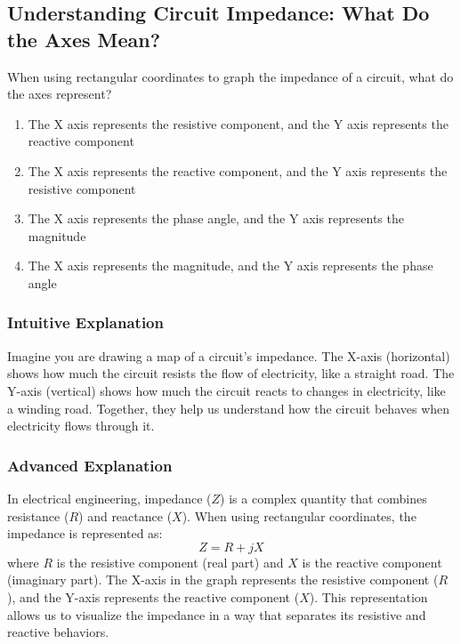 \subsection{Understanding Circuit Impedance: What Do the Axes Mean?}

\begin{tcolorbox}[colback=gray!10!white,colframe=black!75!black,title=E5C09] When using rectangular coordinates to graph the impedance of a circuit, what do the axes represent?
    \begin{enumerate}[label=\Alph*),noitemsep]
        \item The X axis represents the resistive component, and the Y axis represents the reactive component
        \item The X axis represents the reactive component, and the Y axis represents the resistive component
        \item The X axis represents the phase angle, and the Y axis represents the magnitude
        \item The X axis represents the magnitude, and the Y axis represents the phase angle
    \end{enumerate}
\end{tcolorbox}

\subsubsection{Intuitive Explanation}
Imagine you are drawing a map of a circuit's impedance. The X-axis (horizontal) shows how much the circuit resists the flow of electricity, like a straight road. The Y-axis (vertical) shows how much the circuit reacts to changes in electricity, like a winding road. Together, they help us understand how the circuit behaves when electricity flows through it.

\subsubsection{Advanced Explanation}
In electrical engineering, impedance (\(Z\)) is a complex quantity that combines resistance (\(R\)) and reactance (\(X\)). When using rectangular coordinates, the impedance is represented as:
\[
Z = R + jX
\]
where \(R\) is the resistive component (real part) and \(X\) is the reactive component (imaginary part). The X-axis in the graph represents the resistive component (\(R\)), and the Y-axis represents the reactive component (\(X\)). This representation allows us to visualize the impedance in a way that separates its resistive and reactive behaviors.

